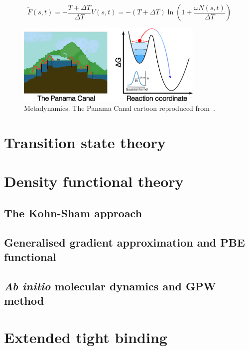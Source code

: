 \begin{equation}
\label{eq:free_energy_surface_reconstruction}
\tilde{F}(s,t) = -\frac{T + \Delta T}{\Delta T} V(s,t) 
= -(T + \Delta T) \ln\left(1 + \frac{\omega N(s,t)}{\Delta T} \right)
\end{equation}

\begin{figure}[htbp]
    \centering
    \includegraphics[width=0.8\textwidth]{Figures/2_Theory/theory_metadynamics.png}
    \caption{Metadynamics. The Panama Canal cartoon reproduced from~\citep{HowPanamaCanal}.}
    \label{fig:metadynamics}
\end{figure}



\section{Transition state theory}



\section{Density functional theory}

\subsection{The Kohn-Sham approach}

\subsection{Generalised gradient approximation and PBE functional}

\subsection{\textit{Ab initio} molecular dynamics and GPW method}



\section{Extended tight binding}



